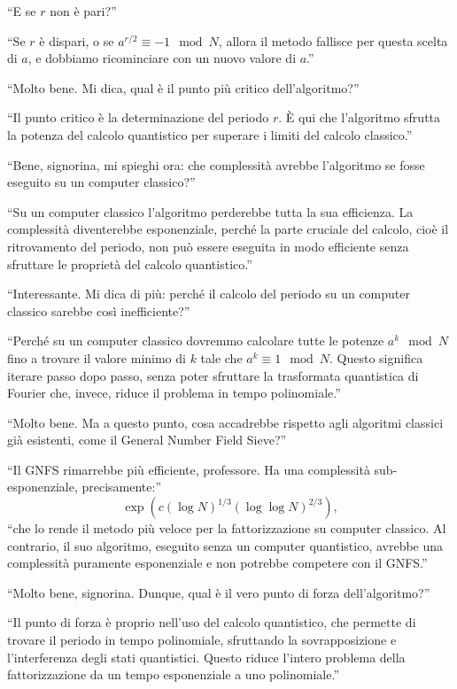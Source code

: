 \begin{dialogue}
 \enquote{E se \( r \) non è pari?}

 \enquote{Se \( r \) è dispari, o se \( a^{r/2} \equiv -1 \mod N \), allora il metodo fallisce per questa scelta di \( a \), e dobbiamo ricominciare con un nuovo valore di \( a \).}

 \enquote{Molto bene. Mi dica, qual è il punto più critico dell'algoritmo?}

 \enquote{Il punto critico è la determinazione del periodo \( r \). È qui che l'algoritmo sfrutta la potenza del calcolo quantistico per superare i limiti del calcolo classico.}

 \enquote{Bene, signorina, mi spieghi ora: che complessità avrebbe l'algoritmo se fosse eseguito su un computer classico?}

 \enquote{Su un computer classico l'algoritmo perderebbe tutta la sua efficienza. La complessità diventerebbe esponenziale, perché la parte cruciale del calcolo, cioè il ritrovamento del periodo, non può essere eseguita in modo efficiente senza sfruttare le proprietà del calcolo quantistico.}

 \enquote{Interessante. Mi dica di più: perché il calcolo del periodo su un computer classico sarebbe così inefficiente?}

 \enquote{Perché su un computer classico dovremmo calcolare tutte le potenze \( a^k \mod N \) fino a trovare il valore minimo di \( k \) tale che \( a^k \equiv 1 \mod N \). Questo significa iterare passo dopo passo, senza poter sfruttare la trasformata quantistica di Fourier che, invece, riduce il problema in tempo polinomiale.}

 \enquote{Molto bene. Ma a questo punto, cosa accadrebbe rispetto agli algoritmi classici già esistenti, come il General Number Field Sieve?}

 \enquote{Il GNFS rimarrebbe più efficiente, professore. Ha una complessità sub-esponenziale, precisamente:}
\[
\exp\left(c (\log N)^{1/3} (\log \log N)^{2/3}\right),
\]
\enquote{che lo rende il metodo più veloce per la fattorizzazione su computer classico. Al contrario, il suo algoritmo, eseguito senza un computer quantistico, avrebbe una complessità puramente esponenziale e non potrebbe competere con il GNFS.}

 \enquote{Molto bene, signorina. Dunque, qual è il vero punto di forza dell'algoritmo?}

 \enquote{Il punto di forza è proprio nell'uso del calcolo quantistico, che permette di trovare il periodo in tempo polinomiale, sfruttando la sovrapposizione e l'interferenza degli stati quantistici. Questo riduce l'intero problema della fattorizzazione da un tempo esponenziale a uno polinomiale.}


\end{dialogue}
